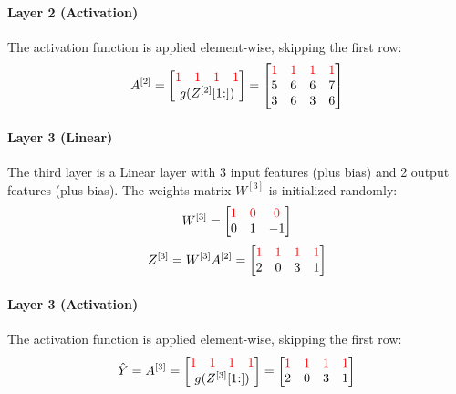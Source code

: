 \paragraph{Layer 2 (Activation)} The activation function is applied element-wise, skipping the first row:
\begin{equation*}
    A^{[2]} = \mqty[
        \mqty{\color{red} 1 & \color{red} 1 & \color{red} 1 & \color{red} 1} \\
        g(Z^{[2]}[1\hspace{-0.6ex}:])
    ] = \mqty[
        \color{red} 1 & \color{red} 1 & \color{red} 1 & \color{red} 1 \\
        5 & 6 & 6 & 7 \\
        3 & 6 & 3 & 6
    ]
\end{equation*}

\paragraph{Layer 3 (Linear)} The third layer is a Linear layer with 3 input features (plus bias) and 2 output features (plus bias). The weights matrix $W^{[3]}$ is initialized randomly:
\begin{equation*}
    W^{[3]} = \mqty[
        \color{red} 1 & \color{red} 0 & \color{red} 0 \\
        0 & 1 & -1
    ]
\end{equation*}
\begin{equation*}
    Z^{[3]} = W^{[3]} A^{[2]} = \mqty[
        \color{red} 1 & \color{red} 1 & \color{red} 1 & \color{red} 1 \\
        2 & 0 & 3 & 1
    ]
\end{equation*}

\paragraph{Layer 3 (Activation)} The activation function is applied element-wise, skipping the first row:
\begin{equation*}
    \hat{Y} = A^{[3]} = \mqty[
        \mqty{\color{red} 1 & \color{red} 1 & \color{red} 1 & \color{red} 1} \\
        g(Z^{[3]}[1\hspace{-0.6ex}:])
    ] = \mqty[
        \color{red} 1 & \color{red} 1 & \color{red} 1 & \color{red} 1 \\
        2 & 0 & 3 & 1
    ]
\end{equation*}


